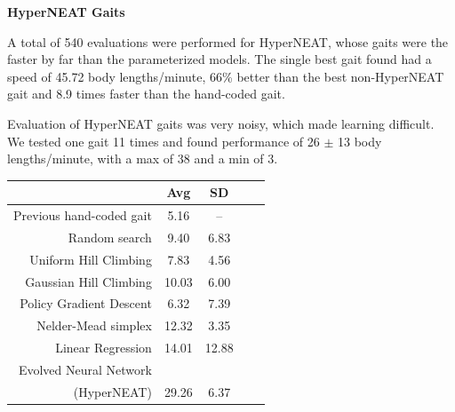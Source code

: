 \documentclass[portrait,final]{baposter}
\begin{document}
\begin{poster}
{


\textbf{HyperNEAT Gaits}
\vspace{.5em}

\noindent A total of 540 evaluations were performed for HyperNEAT, whose gaits
were the faster by far than the parameterized models.  The single best
gait found had a speed of 45.72 body lengths/minute, 66\% better than
the best non-HyperNEAT gait and 8.9 times faster than the hand-coded
gait.

Evaluation of HyperNEAT gaits was very noisy, which made learning
difficult. We tested one gait 11 times and found performance of 26
$\pm$ 13 body lengths/minute, with a max of 38 and a min of 3.




{\scriptsize
\begin{center}
\begin{tabular}{|r|c|c|c||c|}
\hline
                                         & Avg & SD \\
\hline                                    
\hline                                    
Previous hand-coded gait                 & 5.16   &   --     \\
\hline
Random search                            & 9.40   &   6.83   \\
\hline
Uniform Hill Climbing             & 7.83   &   4.56   \\
\hline
Gaussian Hill Climbing            & 10.03  &   6.00   \\
\hline
Policy Gradient Descent                  & 6.32   &   7.39   \\
\hline
Nelder-Mead simplex                      & 12.32  &   3.35   \\
\hline
Linear Regression                        & 14.01  &  12.88   \\
\hline
Evolved Neural Network              &        &          \\
(HyperNEAT)                              & 29.26  &   6.37   \\
\hline
\end{tabular}
  
\end{center}
}

}
\end{poster}
\end{document}
